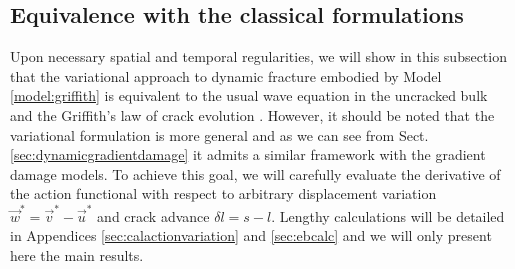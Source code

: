 \subsection{Equivalence with the classical formulations}
Upon necessary spatial and temporal regularities, we will show in this subsection that the variational approach to dynamic fracture embodied by Model \ref{model:griffith} is equivalent to the usual wave equation in the uncracked bulk and the Griffith's law of crack evolution \cite{Freund:1990}. However, it should be noted that the variational formulation is more general and as we can see from Sect. \ref{sec:dynamicgradientdamage} it admits a similar framework with the gradient damage models. To achieve this goal, we will carefully evaluate the derivative of the action functional with respect to arbitrary displacement variation $\vec{w}^*=\vec{v}^*-\vec{u}^*$ and crack advance $\delta l=s-l$. Lengthy calculations will be detailed in Appendices \ref{sec:calactionvariation} and \ref{sec:ebcalc} and we will only present here the main results.


